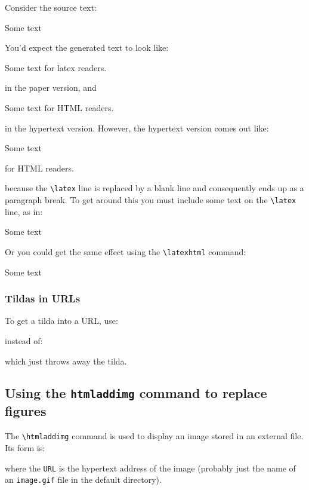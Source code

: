 \documentclass[twoside,11pt,nolof]{starlink}
\begin{document}
Consider the source text:
\begin{terminalv}
Some text
\end{terminalv}
You'd expect the generated text to look like:
\begin{terminalv}
Some text for latex readers.
\end{terminalv}
in the paper version, and
\begin{terminalv}
Some text for HTML readers.
\end{terminalv}
in the hypertext version.
However, the hypertext version comes out like:
\begin{terminalv}
Some text

for HTML readers.
\end{terminalv}
because the \verb+\latex+ line is replaced by a blank line and
consequently ends up as a paragraph break.
To get around this you must include some text on the \verb+\latex+ line,
as in:
\begin{terminalv}
Some text  
\end{terminalv}
Or you could get the same effect using the \verb+\latexhtml+ command:
\begin{terminalv}
Some text 
\end{terminalv}


\subsubsection{Tildas in URLs}

To get a tilda into a URL, use:
\begin{terminalv}
\end{terminalv}
instead of:
\begin{terminalv}
\end{terminalv}
which just throws away the tilda.

\subsection{Using the {\texttt{htmladdimg}} command to replace figures}

The \verb+\htmladdimg+ command is used to display an image stored in an
external file.
Its form is:
\begin{terminalv}
\end{terminalv}
where the \texttt{URL} is the hypertext address of the image (probably just
the name of an \texttt{image.gif} file in the default directory).
\end{document}
